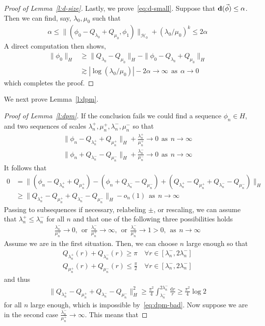 \documentclass[10pt,reqno]{amsart}
\newcommand{\HH}{\mathcal{H}}
\newcommand{\al}{\alpha}
\newcommand{\la}{\lambda}
\newcommand{\abs}[1]{\left\lvert{#1}\right\rvert}
\newcommand{\EQ}[1]{\begin{equation}\begin{split} #1 \end{split}\end{equation}}
\numberwithin{equation}{section}
\theoremstyle{remark}
\newcommand{\mor}{{\ \ \text{or} \ \ }}
\newcommand{\mas}{{\ \ \text{as} \ \ }}
\newcommand{\ud}{\mathrm{d}}
\newcommand{\0}{\emptyset}
\newcommand{\bfd}{{\bf d}}
\begin{document}
\begin{proof}[Proof of Lemma~\ref{l:d-size}]
 
 
 Lastly, we prove~\eqref{eq:d-small}. Suppose that $\bfd(\vec \phi) \le \al$. Then we can find, say, $\la_0, \mu_0$ such that 
 \EQ{
\al \le  \|( \phi_0 - Q_{\la_0} + Q_{\mu_0}, \phi_1) \|_{\HH_0} + \left(\la_0/\mu_0 \right)^k  \le 2 \al
 }
 A direct computation then shows, 
 \EQ{
 \| \phi_0 \|_H  &\ge  \| Q_{\la_0} - Q_{\mu_0} \|_H  - \| \phi_0 - Q_{\la_0} + Q_{\mu_0} \|_{H} \\
 & \gtrsim   \abs{\log(\la_0/ \mu_0)} - 2\al  \to  \infty \mas \al   \to 0
 }
 which completes the proof. 
 \end{proof} 
 
 
 We next prove Lemma~\ref{l:dpm}. 
 \begin{proof}[Proof of Lemma~\ref{l:dpm}]
If the conclusion fails we could find a sequence  $\phi_n \in H$, and two sequences of scales $\la_n^+, \mu_n^+, \la_n^-, \mu_n^-$ so that 
\EQ{
\| \phi_n - Q_{\la_n^+} + Q_{\mu_{n}^+} \|_H + \frac{\la_{n}^{+}}{\mu_{n}^{+}}  \to 0 \mas n \to \infty \\
\| \phi_n + Q_{\la_n^-} - Q_{\mu_{n}^-} \|_H + \frac{\la_{n}^{-}}{\mu_{n}^{-}}  \to 0 \mas n \to \infty
}
It follows that 
\begin{align} 
0   &= \|( \phi_n - Q_{\la_n^+} + Q_{\mu_{n}^+} ) - (\phi_n  +Q_{\la_n^-} -Q_{\mu_{n}^-}) +(Q_{\la_n^+} - Q_{\mu_{n}^+} + Q_{\la_n^-} - Q_{\mu_{n}^-})\|_H \\
& \ge  \| Q_{\la_n^+} - Q_{\mu_{n}^+} + Q_{\la_n^-} - Q_{\mu_{n}^-} \|_H - o_n(1) \mas n \to \infty\label{eq:dpm-bad}
\end{align}
Passing to subsequences if necessary,  relabeling $\pm$, or rescaling, we can assume that $\la_{n}^+ \le \la_{n}^-$ for all $n$  and that one of  the following three possibilities holds
\EQ{
\frac{\la_{n}^{-}}{\mu_{n}^+} \to 0 , \mor \frac{\la_{n}^{-}}{\mu_{n}^+} \to \infty, \mor \frac{\la_{n}^{-}}{\mu_{n}^+} \to 1>0, \mas n \to \infty
}
Assume we are in the first situation. Then, we can choose $n$ large enough so that 
\EQ{
Q_{\la_n^+}(r) + Q_{\la_n^-}(r) \ge  \pi \quad \forall r \in [\la_{n}^-,  2 \la_{n}^-] \\ 
 Q_{\mu_{n}^+}(r) +  Q_{\mu_{n}^-}(r) \le \frac{\pi}{2}  \quad \forall r \in [\la_{n}^-,  2 \la_{n}^-]
}
and thus 
\EQ{
 \| Q_{\la_n^+} - Q_{\mu_{n}^+} + Q_{\la_n^-} - Q_{\mu_{n}^-} \|_H^2 \ge \frac{\pi^2}{4}\int_{\la_n^-}^{2 \la_n^-} \frac{\ud r}{r} \ge  \frac{\pi^2}{4} \log 2
}
for all $n$ large enough, which is impossible by~\eqref{eq:dpm-bad}. Now suppose we are in the second case $\frac{\la_{n}^{-}}{\mu_{n}^+} \to \infty$. This means that 

\end{proof}
\end{document}
